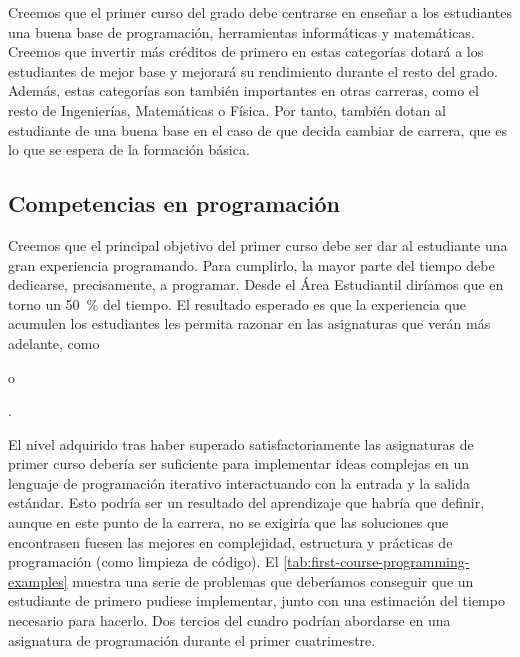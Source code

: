 Creemos que el primer curso del grado debe centrarse en
enseñar a los estudiantes una buena base de
programación,
herramientas informáticas y
matemáticas.
Creemos que invertir más créditos de primero en estas categorías
dotará a los estudiantes de mejor base y
mejorará su rendimiento durante el resto del grado.
Además, estas categorías son también importantes en otras carreras,
como el resto de Ingenierías, Matemáticas o Física.
Por tanto, también dotan al estudiante de una buena base
en el caso de que decida cambiar de carrera,
que es lo que se espera de la formación básica.

\subsection{Competencias en programación}

Creemos que el principal objetivo del primer curso debe ser
dar al estudiante una gran experiencia programando.
Para cumplirlo, la mayor parte del tiempo debe dedicarse,
precisamente, a programar.
Desde el Área Estudiantil diríamos que
en torno un \SI{50}{\percent} del tiempo.
El resultado esperado es que la experiencia que acumulen los estudiantes
les permita razonar en las asignaturas que verán más adelante,
como \subject{Programación Orientada a Objetos} o
\subject{Algoritmos y Estructuras de Datos}\footnotemark.


El nivel adquirido tras
haber superado satisfactoriamente las asignaturas de primer curso
debería ser suficiente para implementar ideas complejas en
un lenguaje de programación iterativo
interactuando con la entrada y la salida estándar.
Esto podría ser un resultado del aprendizaje que habría que definir,
aunque en este punto de la carrera,
no se exigiría que las soluciones que encontrasen fuesen las mejores en
complejidad, estructura y prácticas de programación
(como limpieza de código).
El \cref{tab:first-course-programming-examples}
muestra una serie de problemas que deberíamos conseguir que
un estudiante de primero pudiese implementar,
junto con una estimación del tiempo necesario para hacerlo.
Dos tercios del cuadro podrían abordarse en
una asignatura de programación durante el primer cuatrimestre.

